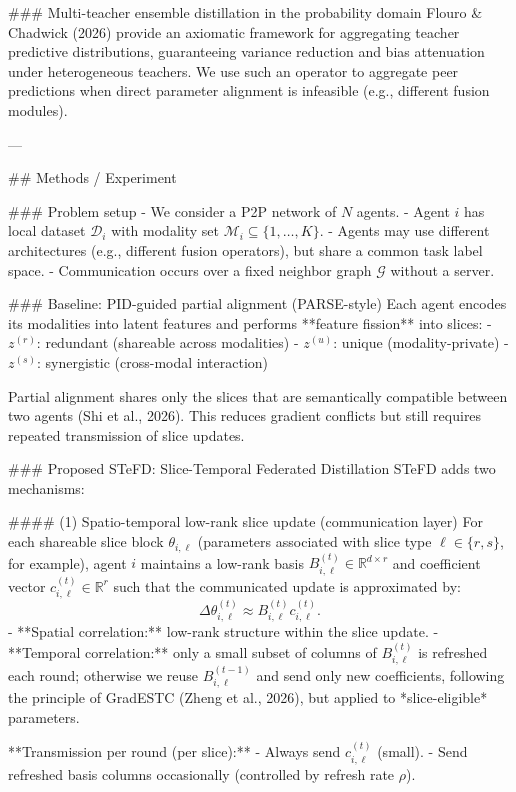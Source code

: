 ### Multi-teacher ensemble distillation in the probability domain  
Flouro & Chadwick (2026) provide an axiomatic framework for aggregating teacher predictive distributions, guaranteeing variance reduction and bias attenuation under heterogeneous teachers. We use such an operator to aggregate peer predictions when direct parameter alignment is infeasible (e.g., different fusion modules).

---

## Methods / Experiment  

### Problem setup  
- We consider a P2P network of \(N\) agents.  
- Agent \(i\) has local dataset \(\mathcal{D}_i\) with modality set \(\mathcal{M}_i \subseteq \{1,\dots,K\}\).  
- Agents may use different architectures (e.g., different fusion operators), but share a common task label space.  
- Communication occurs over a fixed neighbor graph \(\mathcal{G}\) without a server.

### Baseline: PID-guided partial alignment (PARSE-style)  
Each agent encodes its modalities into latent features and performs **feature fission** into slices:
- \(z^{(r)}\): redundant (shareable across modalities)  
- \(z^{(u)}\): unique (modality-private)  
- \(z^{(s)}\): synergistic (cross-modal interaction)  

Partial alignment shares only the slices that are semantically compatible between two agents (Shi et al., 2026). This reduces gradient conflicts but still requires repeated transmission of slice updates.

### Proposed STeFD: Slice-Temporal Federated Distillation  
STeFD adds two mechanisms:

#### (1) Spatio-temporal low-rank slice update (communication layer)  
For each shareable slice block \(\theta_{i,\ell}\) (parameters associated with slice type \(\ell \in \{r,s\}\), for example), agent \(i\) maintains a low-rank basis \(B_{i,\ell}^{(t)} \in \mathbb{R}^{d \times r}\) and coefficient vector \(c_{i,\ell}^{(t)} \in \mathbb{R}^{r}\) such that the communicated update is approximated by:
\[
\Delta \theta_{i,\ell}^{(t)} \approx B_{i,\ell}^{(t)} c_{i,\ell}^{(t)}.
\]
- **Spatial correlation:** low-rank structure within the slice update.  
- **Temporal correlation:** only a small subset of columns of \(B_{i,\ell}^{(t)}\) is refreshed each round; otherwise we reuse \(B_{i,\ell}^{(t-1)}\) and send only new coefficients, following the principle of GradESTC (Zheng et al., 2026), but applied to *slice-eligible* parameters.

**Transmission per round (per slice):**
- Always send \(c_{i,\ell}^{(t)}\) (small).  
- Send refreshed basis columns occasionally (controlled by refresh rate \(\rho\)).  

